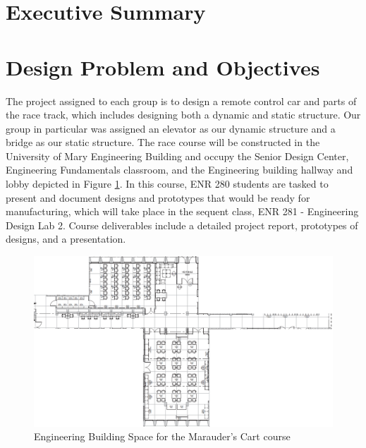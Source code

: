 \documentclass[fleqn,12pt]{project}
\affiliation{\textsuperscript{1}\textit{School of Engineering, 
  University of Mary, Bismarck, North Dakota}}
\affiliation{*ajgarcia@umary.edu}
\begin{document}
\flushbottom
\maketitle
\newpage
\tableofcontents
\thispagestyle{empty}
\newpage
\section*{Executive Summary}

\newpage
\section{Design Problem and Objectives}

 The project assigned to each group is to design a remote control car and parts of the race track, which includes designing both a dynamic and static structure. Our group in particular was assigned an elevator as our dynamic structure and a bridge as our static structure. The race course will be constructed in the University of Mary Engineering Building and occupy the Senior Design Center, Engineering Fundamentals classroom, and the Engineering building hallway and lobby depicted in Figure \ref{fig:Fig1}. In this course, ENR 280 students are tasked to present and document designs and prototypes that would be ready for manufacturing, which will take place in the sequent class, ENR 281 - Engineering Design Lab 2. Course deliverables include a detailed project report, prototypes of designs, and a presentation. 

\begin{figure}\centering
\includegraphics[width=17cm]{Figures/Floorplan}
\caption{Engineering Building Space for the Marauder's Cart course}
\label{fig:Fig1}
\end{figure}
\end{document}
